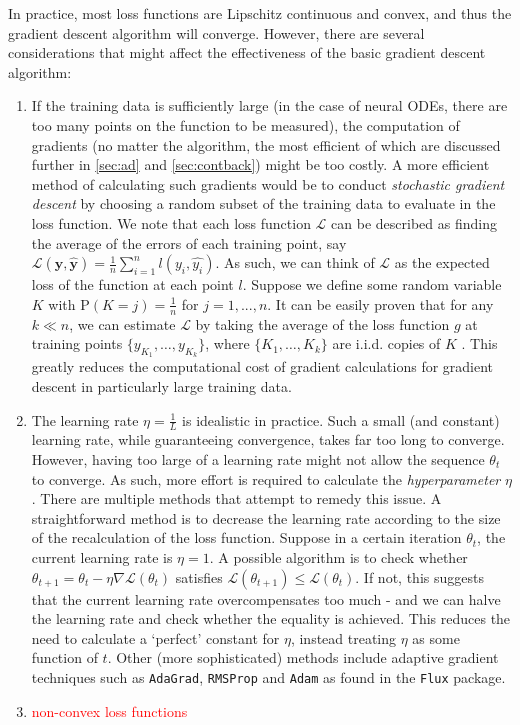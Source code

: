\documentclass[a4paper,11pt,titlepage]{article}
\theoremstyle{definition}
\theoremstyle{plain}
\theoremstyle{remark}
\begin{document}
In practice, most loss functions are Lipschitz continuous and convex, and thus the gradient descent algorithm will converge. However, there are several considerations that might affect the effectiveness of the basic gradient descent algorithm:
\begin{enumerate}
    \item If the training data is sufficiently large (in the case of neural ODEs, there are too many points on the function to be measured), the computation of gradients (no matter the algorithm, the most efficient of which are discussed further in \ref{sec:ad} and \ref{sec:contback}) might be too costly. A more efficient method of calculating such gradients would be to conduct \textit{stochastic gradient descent} by choosing a random subset of the training data to evaluate in the loss function. We note that each loss function $\mathcal{L}$ can be described as finding the average of the errors of each training point, say $\mathcal{L}(\mathbf{y},\mathbf{\hat{y}}) = \frac{1}{n} \sum_{i=1}^n l(y_i, \hat{y_i})$. As such, we can think of $\mathcal{L}$ as the expected loss of the function at each point $l$. Suppose we define some random variable $K$ with $\mathrm{P}(K = j) = \frac{1}{n}$ for $j = 1, ..., n$. It can be easily proven that for any $k \ll n$, we can estimate $\mathcal{L}$ by taking the average of the loss function $g$ at training points $\{y_{K_1}, \dots, y_{K_k}\}$, where $\{K_1, \dots, K_k\}$ are i.i.d. copies of $K$ \cite{kroese2019}. This greatly reduces the computational cost of gradient calculations for gradient descent in particularly large training data.
    
    \item The learning rate $\eta = \frac{1}{L}$ is idealistic in practice. Such a small (and constant) learning rate, while guaranteeing convergence, takes far too long to converge. However, having too large of a learning rate might not allow the sequence $\theta_t$ to converge. As such, more effort is required to calculate the \textit{hyperparameter} $\eta$. There are multiple methods that attempt to remedy this issue. A straightforward method is to decrease the learning rate according to the size of the recalculation of the loss function. Suppose in a certain iteration $\theta_t$, the current learning rate is $\eta = 1$. A possible algorithm is to check whether $\theta_{t+1} = \theta_t - \eta \nabla\mathcal{L}(\theta_t)$ satisfies $\mathcal{L}(\theta_{t+1}) \leq \mathcal{L}(\theta_t)$. If not, this suggests that the current learning rate overcompensates too much - and we can halve the learning rate and check whether the equality is achieved. This reduces the need to calculate a ‘perfect’ constant for $\eta$, instead treating $\eta$ as some function of $t$. Other (more sophisticated) methods include adaptive gradient techniques such as \texttt{AdaGrad}, \texttt{RMSProp} and \texttt{Adam} as found in the \texttt{Flux} package.

    \item \textcolor{red}{non-convex loss functions}
\end{enumerate}
\end{document}
